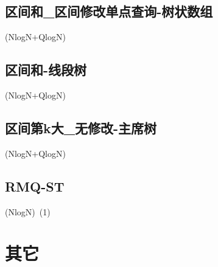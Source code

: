 \documentclass[10pt]{article}
\begin{document}
\subsection{区间和_区间修改单点查询-树状数组}
(NlogN+QlogN)


\subsection{区间和-线段树}
(NlogN+QlogN)


\subsection{区间第k大_无修改-主席树}
(NlogN+QlogN)


\subsection{RMQ-ST}
(NlogN)~(1)

\section{其它}
\end{document}

